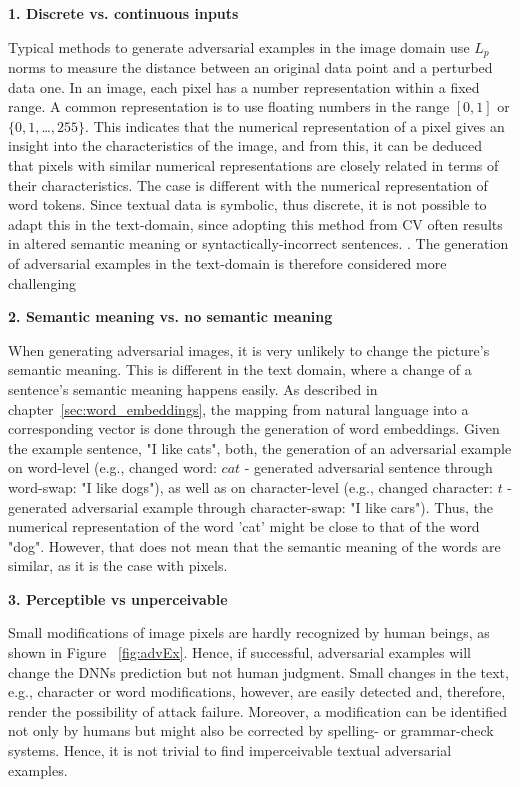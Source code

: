 \textbf{1. Discrete vs. continuous inputs}

Typical methods to generate adversarial examples in the image domain use $L_p$ norms to measure the distance between an original data point and a perturbed data one. 
In an image, each pixel has a number representation within a fixed range.  A common representation is to use floating numbers in the range ${[0,1]}$ or ${\{0,1,}$\dots${,255\}}$. This indicates that the numerical representation of a pixel gives an insight into the characteristics of the image, and from this, it can be deduced that pixels with similar numerical representations are closely related in terms of their characteristics. The case is different with the numerical representation of word tokens.
Since textual data is symbolic, thus discrete, it is not possible to adapt this in the text-domain, since adopting this method from CV often results in altered semantic meaning or syntactically-incorrect sentences. . The generation of adversarial examples in the text-domain is therefore considered more challenging\cite{carlini2018audio} 

\textbf{2. Semantic meaning vs. no semantic meaning}

When generating adversarial images, it is very unlikely to change the picture's semantic meaning. This is different in the text domain, where a change of a sentence's semantic meaning happens easily. As described in chapter~\ref{sec:word_embeddings}, the mapping from natural language into a corresponding vector is done through the generation of word embeddings.
Given the example sentence, "I like cats", both, the generation of an adversarial example on word-level (e.g., changed word: $cat$ - generated adversarial sentence through word-swap:  "I like dogs"), as well as on character-level (e.g., changed character: $t$ - generated adversarial example through character-swap: "I like cars"). Thus, the numerical representation of the word 'cat' might be close to that of the word "dog".
However, that does not mean that the semantic meaning of the words are similar, as it is the case with pixels.


\textbf{3. Perceptible vs unperceivable}

Small modifications of image pixels are hardly recognized by human beings, as shown in Figure ~\ref{fig:advEx}. Hence, if successful, adversarial examples will change the DNNs prediction but not human judgment. Small changes in the text, e.g., character or word modifications, however, are easily detected and, therefore, render the possibility of attack failure. Moreover, a modification can be identified not only by humans but might also be corrected by spelling- or grammar-check systems. Hence, it is not trivial to find imperceivable textual adversarial examples.



